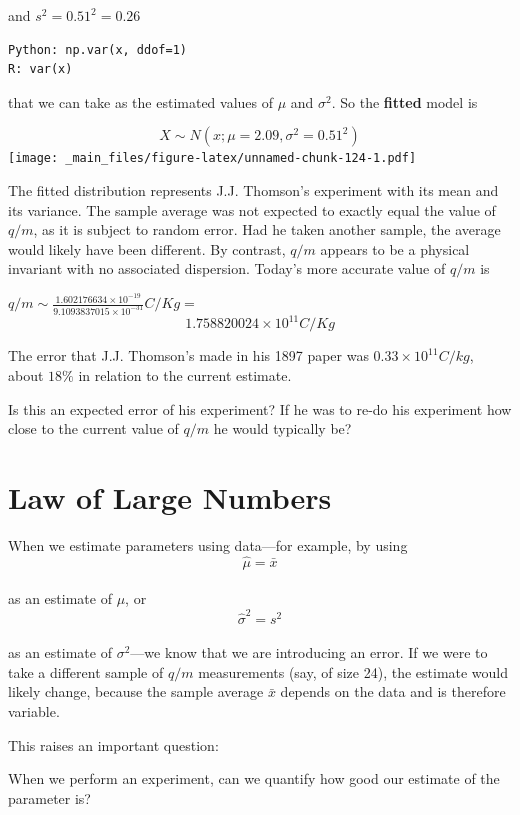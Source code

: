 \documentclass[
]{book}
\begin{document}
and \(s^2=0.51^2=0.26\)

\begin{verbatim}
Python: np.var(x, ddof=1)
R: var(x)
\end{verbatim}

that we can take as the estimated values of \(\mu\) and \(\sigma^2\). So the \textbf{fitted} model is

\[X \sim N(x; \mu=2.09, \sigma^2=0.51^2)\]
\texttt{[image: \_main\_files/figure-latex/unnamed-chunk-124-1.pdf]}

The fitted distribution represents J.J. Thomson's experiment with its mean and its variance. The sample average was not expected to exactly equal the value of \(q/m\), as it is subject to random error. Had he taken another sample, the average would likely have been different. By contrast, \(q/m\) appears to be a physical invariant with no associated dispersion. Today's more accurate value of \(q/m\) is

\(q/m \sim \frac{1.602176634\times 10^{-19}}{9.1093837015\times 10^{−31}} C/Kg =\) \[1.758820024\times 10^{11} C/Kg\]

The error that J.J. Thomson's made in his 1897 paper was \(0.33\times 10^{11} C/kg\), about \(18\%\) in relation to the current estimate.

Is this an expected error of his experiment? If he was to re-do his experiment how close to the current value of \(q/m\) he would typically be?

\hypertarget{law-of-large-numbers}{%
\section{Law of Large Numbers}\label{law-of-large-numbers}}

When we estimate parameters using data---for example, by using\\
\[
\hat{\mu} = \bar{x}
\]\\
as an estimate of \(\mu\), or\\
\[
\hat{\sigma}^2 = s^2
\]\\
as an estimate of \(\sigma^2\)---we know that we are introducing an error. If we were to take a different sample of \(q/m\) measurements (say, of size 24), the estimate would likely change, because the sample average \(\bar{x}\) depends on the data and is therefore variable.

This raises an important question:

When we perform an experiment, can we quantify how good our estimate of the parameter is?
\end{document}
